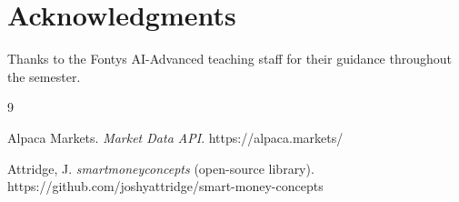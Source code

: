 \documentclass[10pt, twocolumn, letterpaper]{article}
\begin{document}
\section*{Acknowledgments}
Thanks to the Fontys AI-Advanced teaching staff for their guidance throughout the semester.


{\scriptsize \raggedright
\begin{thebibliography}{9}
\setlength{\itemsep}{0pt}\setlength{\parsep}{0pt}

Alpaca Markets. \textit{Market Data API}. https://alpaca.markets/

Attridge, J. \textit{smartmoneyconcepts} (open-source library). https://github.com/joshyattridge/smart-money-concepts

\end{thebibliography}
}
\end{document}
